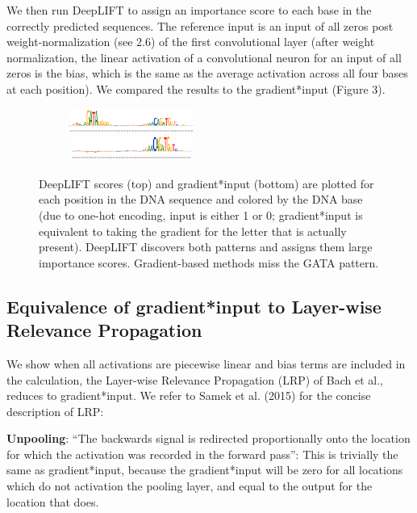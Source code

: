 \documentclass{article}
\begin{document}
We then run DeepLIFT to assign an importance score to each base in the correctly predicted sequences. The reference input is an input of all zeros post weight-normalization (see 2.6) of the first convolutional layer (after weight normalization, the linear activation of a convolutional neuron for an input of all zeros is the bias, which is the same as the average activation across all four bases at each position). We compared the results to the gradient*input (Figure 3).

\begin{figure}[!ht]
\vspace{-10px}
\begin{center}
\includegraphics[width=230px,height=30px]{LIFTPADSequence2.png}
\includegraphics[width=230px,height=30px]{GradientSequence2.png}
\caption{DeepLIFT scores (top) and gradient*input (bottom) are plotted for each position in the DNA sequence and colored by the DNA base (due to one-hot encoding, input is either 1 or 0; gradient*input is equivalent to taking the gradient for the letter that is actually present). DeepLIFT discovers both patterns and assigns them large importance scores. Gradient-based methods miss the GATA pattern.}
\end{center}
\vspace{-20px}
\end{figure}

\subsection{Equivalence of gradient*input to Layer-wise Relevance Propagation}
We show when all activations are piecewise linear and bias terms are included in the calculation, the Layer-wise Relevance Propagation (LRP) of Bach et al., reduces to gradient*input. We refer to Samek et al. (2015) for the concise description of LRP:

{\bf Unpooling}: ``The backwards signal is redirected proportionally onto the location for which the activation was recorded in the forward pass'': This is trivially the same as gradient*input, because the gradient*input will be zero for all locations which do not activation the pooling layer, and equal to the output for the location that does.
\end{document}
